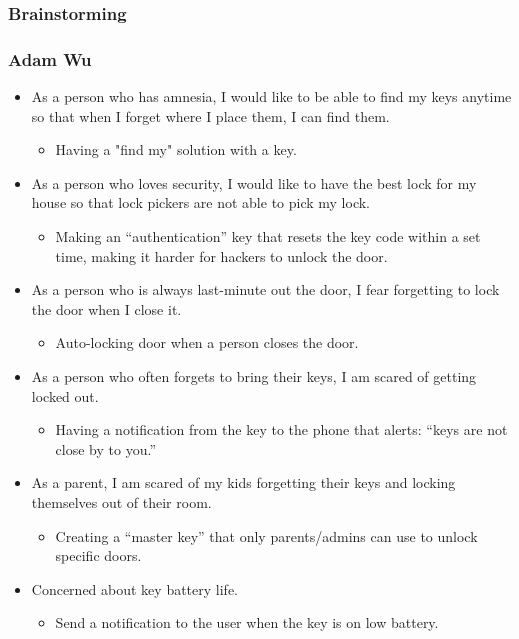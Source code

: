 
\subsubsection{Brainstorming}

\subsubsection*{Adam Wu}
\begin{itemize}
    \item As a person who has amnesia, I would like to be able to find my keys anytime so that when I forget where I place them, I can find them.
    \begin{itemize}
        \item Having a "find my" solution with a key.
    \end{itemize}
    \item As a person who loves security, I would like to have the best lock for my house so that lock pickers are not able to pick my lock.
    \begin{itemize}
        \item Making an “authentication” key that resets the key code within a set time, making it harder for hackers to unlock the door.
    \end{itemize}
    \item As a person who is always last-minute out the door, I fear forgetting to lock the door when I close it.
    \begin{itemize}
        \item Auto-locking door when a person closes the door.
    \end{itemize}
    \item As a person who often forgets to bring their keys, I am scared of getting locked out.
    \begin{itemize}
        \item Having a notification from the key to the phone that alerts: “keys are not close by to you.”
    \end{itemize}
    \item As a parent, I am scared of my kids forgetting their keys and locking themselves out of their room.
    \begin{itemize}
        \item Creating a “master key” that only parents/admins can use to unlock specific doors.
    \end{itemize}
    \item Concerned about key battery life.
    \begin{itemize}
        \item Send a notification to the user when the key is on low battery.
    \end{itemize}
\end{itemize}

